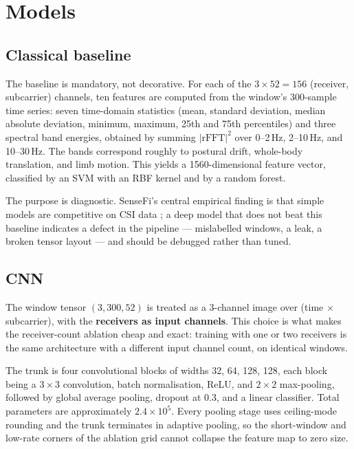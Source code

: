 \section{Models}

\subsection{Classical baseline}

The baseline is mandatory, not decorative. For each of the $3 \times 52 =
156$ (receiver, subcarrier) channels, ten features are computed from the
window's 300-sample time series: seven time-domain statistics (mean,
standard deviation, median absolute deviation, minimum, maximum, 25th and
75th percentiles) and three spectral band energies, obtained by summing
$|\mathrm{rFFT}|^2$ over 0--2\,Hz, 2--10\,Hz, and 10--30\,Hz. The bands
correspond roughly to postural drift, whole-body translation, and limb
motion. This yields a 1560-dimensional feature vector, classified by an
SVM with an RBF kernel and by a random forest.

The purpose is diagnostic. SenseFi's central empirical finding is that
simple models are competitive on CSI data \cite{yang2023sensefi}; a deep
model that does not beat this baseline indicates a defect in the pipeline
--- mislabelled windows, a leak, a broken tensor layout --- and should be
debugged rather than tuned.

\subsection{CNN}

The window tensor $(3, 300, 52)$ is treated as a 3-channel image over
(time $\times$ subcarrier), with the \textbf{receivers as input channels}.
This choice is what makes the receiver-count ablation cheap and exact:
training with one or two receivers is the same architecture with a different
input channel count, on identical windows.

The trunk is four convolutional blocks of widths 32, 64, 128, 128, each
block being a $3\times3$ convolution, batch normalisation, ReLU, and
$2\times2$ max-pooling, followed by global average pooling, dropout at 0.3,
and a linear classifier. Total parameters are approximately
$2.4 \times 10^5$. Every pooling stage uses ceiling-mode rounding and the
trunk terminates in adaptive pooling, so the short-window and low-rate
corners of the ablation grid cannot collapse the feature map to zero size.

